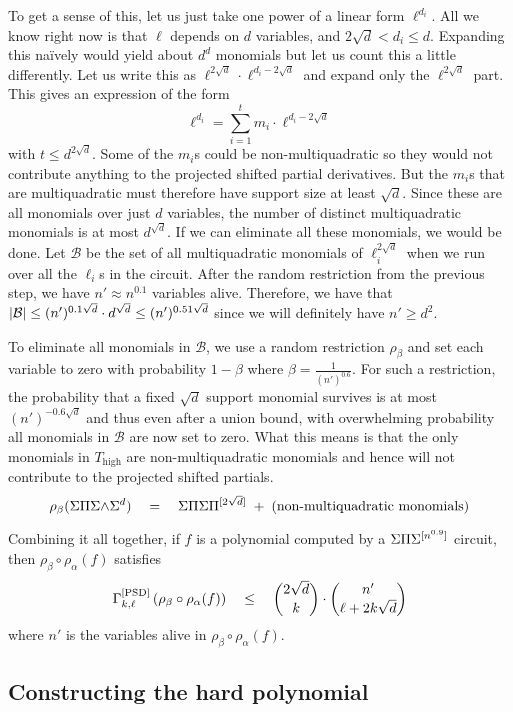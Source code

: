 To get a sense of this, let us just take one power of a linear form $\ell^{d_i}$. All we know right now is that $\ell$ depends on $d$ variables, and $2\sqrt{d} < d_i \leq d$. Expanding this na\"ively would yield about $d^d$ monomials but let us count this a little differently. Let us write this as $\ell^{2\sqrt{d}} \cdot \ell^{d_i - 2\sqrt{d}}$ and expand only the $\ell^{2\sqrt{d}}$ part. This gives an expression of the form
\[
\ell^{d_i} = \sum_{i=1}^t m_i \cdot \ell^{d_i - 2\sqrt{d}}
\]
with $t \leq d^{2\sqrt{d}}$. Some of the $m_i$s could be non-multiquadratic so they would not contribute anything to the projected shifted partial derivatives. But the $m_i$s that are multiquadratic must therefore have support size at least $\sqrt{d}$. Since these are all monomials over just $d$ variables, the number of distinct multiquadratic monomials is at most $d^{\sqrt{d}}$. If we can eliminate all these monomials, we would be done. Let $\mathcal{B}$ be the set of all multiquadratic monomials of $\ell_i^{2\sqrt{d}}$ when we run over all the $\ell_i$s in the circuit. After the random restriction from the previous step, we have $n' \approx n^{0.1}$ variables alive. Therefore, we have that $\left|\mathcal{B}\right| \leq (n')^{0.1\sqrt{d}} \cdot d^{\sqrt{d}} \leq (n')^{0.51 \sqrt{d}}$ since we will definitely have $n' \geq d^2$. 

To eliminate all monomials in $\mathcal{B}$, we use a random restriction $\rho_\beta$ and set each variable to zero with probability $1 - \beta$ where $\beta = \frac{1}{(n')^{0.6}}$. For such a restriction, the probability that a fixed $\sqrt{d}$ support monomial survives is at most $(n')^{-0.6\sqrt{d}}$ and thus even after a union bound, with overwhelming probability all monomials in $\mathcal{B}$ are now set to zero. What this means is that the only monomials in $T_{\text{high}}$ are non-multiquadratic monomials and hence will not contribute to the projected shifted partials. 
\[
\rho_\beta(\Sigma\Pi\Sigma\mathord{\wedge}\Sigma^{d}) \quad = \quad \Sigma\Pi\Sigma\Pi^{[2\sqrt{d}]} \;+\; (\text{non-multiquadratic monomials})
\]

Combining it all together, if $f$ is a polynomial computed by a $\Sigma\Pi\Sigma^{[n^{0.9}]}$ circuit, then $\rho_\beta \circ \rho_\alpha (f)$ satisfies
\[
\Gamma^{\mathrm{[PSD]}}_{k,\ell}\left(\rho_\beta \circ \rho_\alpha(f)\right) \quad \leq \quad \binom{2\sqrt{d}}{k} \cdot \binom{n'}{\ell + 2k\sqrt{d}}
\]
where $n'$ is the variables alive in $\rho_\beta \circ \rho_\alpha(f)$. 

\subsection*{Constructing the hard polynomial}

